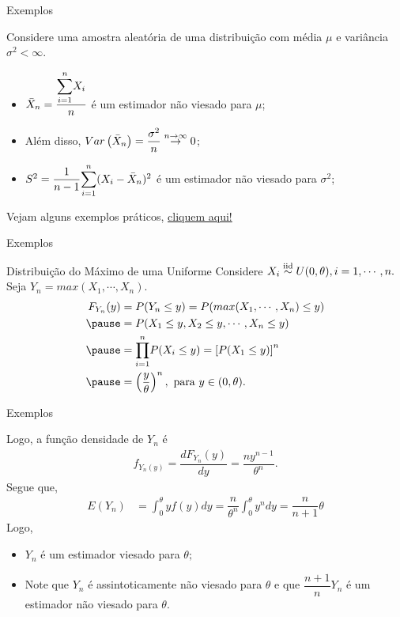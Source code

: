 \documentclass[12pt]{beamer}
\begin{document}
\begin{frame}{Exemplos}
    \begin{block}{}
\justifying
Considere \seqX uma amostra aleatória de uma distribuição com média $\mu$ e variância $\sigma^{2}<\infty.$
\begin{itemize}
    \item $\Bar{X}_{n}=\dfrac{{\displaystyle \sum_{i=1}^{n}} X_{i}}{n}$ é um estimador não viesado para $\mu$;
    \item Além disso, $Var\left(\Bar{X}_{n}\right)=\dfrac{\sigma^{2}}{n}\overset{n\rightarrow\infty}{\rightarrow}0$;
    \item $S^{2}=\dfrac{1}{n-1}{\displaystyle \sum_{i=1}^{n}}(X_{i}-\Bar{X}_{n})^{2}$ é um estimador não viesado para $\sigma^{2}$;
\end{itemize}
\end{block}
\pause
\begin{block}{}
	Vejam alguns exemplos práticos, \href{https://est711.shinyapps.io/EstimadoresViesados/}{cliquem aqui!}
\end{block}
\end{frame}

\begin{frame}{Exemplos}
    \begin{block}{Distribuição do Máximo de uma Uniforme}
\justifying
Considere $X_{i}\overset{\text{iid}}{\sim} U(0,\theta),i=1,\cdots,n.$ Seja $Y_{n}=max(X_{1},\cdots,X_{n}).$
\begin{align*}
    F_{Y_{n}}(y)&=P(Y_{n}\leq y)=P(max(X_{1},\cdots,X_{n})\leq y)\\
    \pause
    &=P(X_{1}\leq y,X_{2}\leq y,\cdots, X_{n}\leq y)\\
    \pause
    &=\Prodi P(X_{i}\leq y)=\left[P(X_{1}\leq y)\right]^{n}\\
    \pause
    &=\left(\dfrac{y}{\theta}\right)^{n},~\text{para}~y\in (0,\theta).
\end{align*}
\end{block}
\end{frame}

\begin{frame}{Exemplos}
\begin{block}{}
\justifying
Logo, a função densidade de $Y_{n}$ é
\begin{align*}
f_{Y_{n}(y)}=\dfrac{dF_{Y_{n}}(y)}{dy}=\dfrac{ny^{n-1}}{\theta^{n}}.
\end{align*}
Segue que, 
\begin{align*}
    E(Y_{n})&=\int_{0}^{\theta}yf(y)dy=\dfrac{n}{\theta^{n}}\int_{0}^{\theta}y^{n}dy=\dfrac{n}{n+1}\theta
\end{align*}
\pause
Logo, 
\begin{itemize}
    \item $Y_{n}$ é um estimador viesado para $\theta;$\pause
    \item Note que $Y_{n}$ é assintoticamente não viesado para $\theta$ e que $\dfrac{n+1}{n}Y_{n}$ é um estimador não viesado para $\theta.$
\end{itemize}
\end{block}
\end{frame}
\end{document}
